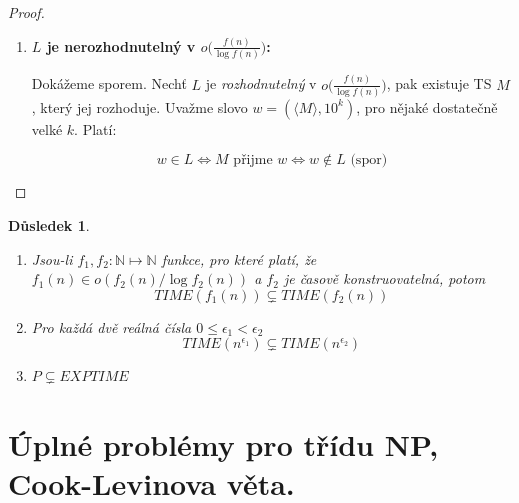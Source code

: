 \documentclass[11pt]{report} %
\newcommand{\N}{\mathbb{N}}
\newtheorem{implication}{Důsledek}[section]
\numberwithin{equation}{section}
\begin{document}
\begin{proof}
\begin{enumerate}
	\item \textbf{$L$ je nerozhodnutelný v $o\big(\frac{f(n)}{\log f(n)}\big)$:}
	
	Dokážeme sporem. Nechť $L$ je \textit{rozhodnutelný} v $o\big(\frac{f(n)}{\log f(n)}\big)$, pak existuje TS $M$, který jej rozhoduje. Uvažme slovo $w = (\langle M \rangle, 10^k)$, pro nějaké dostatečně velké $k$. Platí:
	
	$$w \in L \Leftrightarrow M \text{ přijme } w \Leftrightarrow w \notin L \text{ (spor)}$$

\end{enumerate}
\end{proof}

\begin{implication}~
	\begin{enumerate}
		\item Jsou-li $f_1, f_2 : \N \mapsto \N$ funkce, pro které platí, že $f_1(n) \in o(f_2(n)/ \log f_2(n))$ a $f_2$ je časově konstruovatelná, potom
			$$TIME(f_1(n)) \subsetneq TIME(f_2(n))$$
		\item Pro každá dvě reálná čísla $0 \leq \epsilon_1 < \epsilon_2$
			$$TIME(n^{\epsilon_1}) \subsetneq TIME(n^{\epsilon_2})$$
		\item $P \subsetneq EXPTIME$
	\end{enumerate}
\end{implication}









\section{Úplné problémy pro třídu NP, Cook-Levinova věta.}
\end{document}
